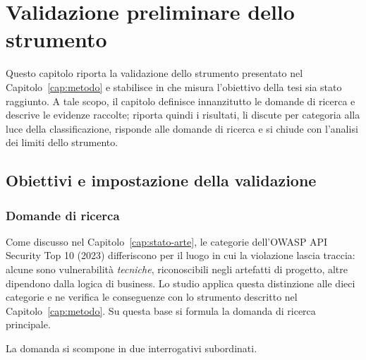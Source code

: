 
\chapter{Validazione preliminare dello strumento}
\label{cap:risultati}

Questo capitolo riporta la validazione dello strumento presentato nel
Capitolo~\ref{cap:metodo} e stabilisce in che misura l'obiettivo della tesi
sia stato raggiunto. A tale scopo, il capitolo definisce innanzitutto le
domande di ricerca e descrive le evidenze raccolte; riporta quindi i risultati,
li discute per categoria alla luce della classificazione, risponde alle domande
di ricerca e si chiude con l'analisi dei limiti dello strumento.

\section{Obiettivi e impostazione della validazione}
\label{sec:ris-oggetto}

\subsection{Domande di ricerca}
\label{sec:research-questions}

Come discusso nel Capitolo~\ref{cap:stato-arte}, le categorie dell'OWASP API
Security Top 10 (2023) differiscono per il luogo in cui la violazione lascia
traccia: alcune sono vulnerabilità \emph{tecniche}, riconoscibili negli
artefatti di progetto, altre dipendono dalla logica di business. Lo studio
applica questa distinzione alle dieci categorie e ne verifica le conseguenze
con lo strumento descritto nel Capitolo~\ref{cap:metodo}. Su questa base si
formula la domanda di ricerca principale.


La domanda si scompone in due interrogativi subordinati.



